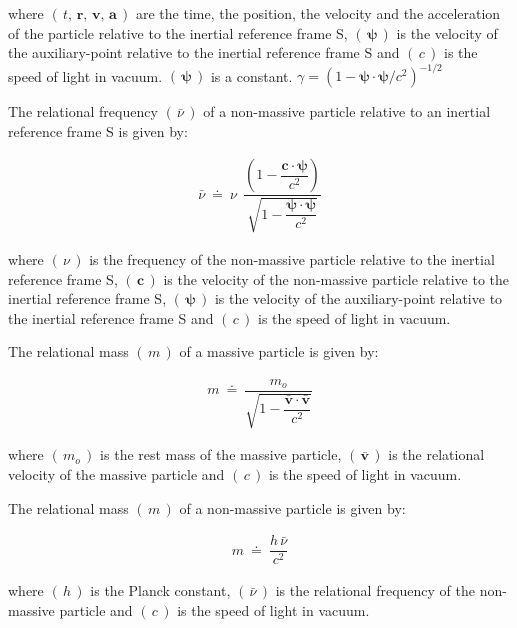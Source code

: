 \documentclass[10pt,fleqn]{article}
\begin{document}
\par \vspace{+1.20em}
\noindent where $( \, t, \, \mathbf{r}, \, \mathbf{v}, \, \mathbf{a} \, )$ are the time, the position, the velocity and the acceleration of the particle relative to the inertial reference frame S, $( \, \boldsymbol{\psi} \, )$ is the velocity of the auxiliary-point relative to the inertial reference frame S and $( \, c \, )$ is the speed of light in vacuum. $( \, \boldsymbol{\psi} \, )$ is a constant. {\small $\gamma = ({1 - \boldsymbol{\psi} \cdot \boldsymbol{\psi}/c^2})^{-1/2}$}

\newpage

\noindent The relational frequency $( \, \bar{\nu} \, )$ of a non-massive particle relative to an inertial reference frame S is given by:
\par \vspace{-0.60em}
\begin{eqnarray*}
\bar{\nu} ~\doteq~ \nu \;\, \dfrac{\left ( 1 - \dfrac{\mathbf{c} \cdot \boldsymbol{\psi}}{c^2} \right )}{\sqrt{1 - \dfrac{\boldsymbol{\psi} \cdot \boldsymbol{\psi}}{c^2}}}
\end{eqnarray*}
\par \vspace{+0.45em}
\noindent where $( \, \nu \, )$ is the frequency of the non-massive particle relative to the inertial reference frame S, $( \, \mathbf{c} \, )$ is the velocity of the non-massive particle relative to the inertial reference frame S, $( \, \boldsymbol{\psi} \, )$ is the velocity of the auxiliary-point relative to the inertial reference frame S and $( \, c \, )$ is the speed of light in vacuum.
\par \vspace{+0.75em}
\noindent The relational mass $( \, m \, )$ of a massive particle is given by:
\par \vspace{-0.60em}
\begin{eqnarray*}
m ~\doteq~ \dfrac{m_o}{\sqrt{1 - \dfrac{\bar{\mathbf{v}} \cdot \bar{\mathbf{v}}}{c^2}}}
\end{eqnarray*}
\par \vspace{+0.45em}
\noindent where $( \, m_o \, )$ is the rest mass of the massive particle, $( \, \bar{\mathbf{v}} \, )$ is the relational velocity of the massive particle and $( \, c \, )$ is the speed of light in vacuum.
\par \vspace{+0.75em}
\noindent The relational mass $( \, m \, )$ of a non-massive particle is given by:
\par \vspace{-0.60em}
\begin{eqnarray*}
m ~\doteq~ \dfrac{h \, \bar{\nu}}{c^2}
\end{eqnarray*}
\par \vspace{+0.45em}
\noindent where $( \, h \, )$ is the Planck constant, $( \, \bar{\nu} \, )$ is the relational frequency of the non-massive particle and $( \, c \, )$ is the speed of light in vacuum.
\end{document}

